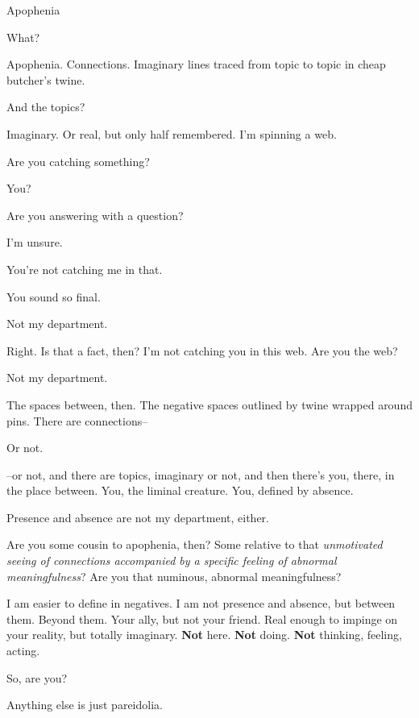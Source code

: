 \noindent Apophenia

\begin{ally}
What?
\end{ally}
Apophenia. Connections. Imaginary lines traced from topic to topic in cheap butcher's twine.

\begin{ally}
And the topics?
\end{ally}
Imaginary. Or real, but only half remembered. I'm spinning a web.

\begin{ally}
Are you catching something?
\end{ally}
You?

\begin{ally}
Are you answering with a question?
\end{ally}
I'm unsure.

\begin{ally}
You're not catching me in that.
\end{ally}
You sound so final.

\begin{ally}
Not my department.
\end{ally}
Right. Is that a fact, then? I'm not catching you in this web. Are you the web?

\begin{ally}
Not my department.
\end{ally}
The spaces between, then. The negative spaces outlined by twine wrapped around pins. There are connections--

\begin{ally}
Or not.
\end{ally}
--or not, and there are topics, imaginary or not, and then there's you, there, in the place between. You, the liminal creature. You, defined by absence.

\begin{ally}
Presence and absence are not my department, either.
\end{ally}
Are you some cousin to apophenia, then? Some relative to that \emph{unmotivated seeing of connections accompanied by a specific feeling of abnormal meaningfulness}? Are you that numinous, abnormal meaningfulness?

\begin{ally}
I am easier to define in negatives. I am not presence and absence, but between them. Beyond them. Your ally, but not your friend. Real enough to impinge on your reality, but totally imaginary. \textbf{Not} here. \textbf{Not} doing. \textbf{Not} thinking, feeling, acting.
\end{ally}
So, are you?

\begin{ally}
Anything else is just pareidolia.
\end{ally}
\newpage
